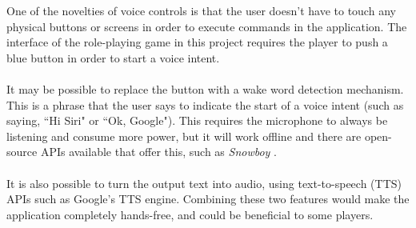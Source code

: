 \documentclass[11pt]{article}
\begin{document}
One of the novelties of voice controls is that the user doesn't have to touch any physical buttons or screens in order to execute commands in the application. The interface of the role-playing game in this project requires the player to push a blue button in order to start a voice intent.
\\
\\
It may be possible to replace the button with a wake word detection mechanism. This is a phrase that the user says to indicate the start of a voice intent (such as saying, ``Hi Siri" or ``Ok, Google"). This requires the microphone to always be listening and consume more power, but it will work offline and there are open-source APIs available that offer this, such as \textit{Snowboy} \cite{RefWorks:133}.
\\
\\
It is also possible to turn the output text into audio, using text-to-speech (TTS) APIs such as Google's TTS engine. Combining these two features would make the application completely hands-free, and could be beneficial to some players.
\end{document}
